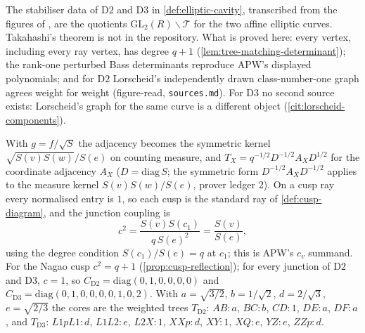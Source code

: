 \begin{assumption}
\label{asm:h-diag}
The stabiliser data of $\mathrm{D2}$ and $\mathrm{D3}$ in \cref{def:elliptic-cavity}, transcribed from the
figures of \cite{arends2026resonances}, are the quotients $\mathrm{GL}_2(R)\backslash\mathcal T$ for the two
affine elliptic curves. Takahashi's theorem is not in the repository. What is proved here: every vertex,
including every ray vertex, has degree $q+1$ (\cref{lem:tree-matching-determinant}); the rank-one
perturbed Bass determinants reproduce APW's displayed polynomials; and for $\mathrm{D2}$ Lorscheid's
independently drawn class-number-one graph agrees weight for weight (figure-read, \texttt{sources.md}). For
$\mathrm{D3}$ no second source exists: Lorscheid's graph for the same curve is a different object
(\cref{cit:lorscheid-components}).
\end{assumption}

\begin{proposition}[Normalisation with $h$ cusps; the arithmetic junction has $c = 1$]
\label{prop:stabiliser-normalisation}
With $g = f/\sqrt S$ the adjacency becomes the symmetric kernel $\sqrt{S(v)S(w)}/S(e)$ on counting measure,
and $T_X = q^{-1/2}D^{-1/2}A_XD^{1/2}$ for the coordinate adjacency $A_X$ ($D = \mathrm{diag}\,S$; the symmetric
form $D^{-1/2}A_XD^{-1/2}$ applies to the measure kernel $S(v)S(w)/S(e)$, prover ledger 2). On a cusp ray every
normalised entry is $1$, so each cusp is the standard ray of \cref{def:cusp-diagram}, and the junction
coupling is
\[
c^2 = \frac{S(v)S(c_1)}{q\,S(e)^2} = \frac{S(v)}{S(e)} ,
\]
using the degree condition $S(c_1)/S(e) = q$ at $c_1$; this is APW's $c_v$ summand. For the Nagao cusp
$c^2 = q+1$ (\cref{prop:cusp-reflection}); for every junction of $\mathrm{D2}$ and $\mathrm{D3}$, $c = 1$, so
$C_{\mathrm{D2}} = \mathrm{diag}(0,1,0,0,0,0)$ and $C_{\mathrm{D3}} = \mathrm{diag}(0,1,0,0,0,0,1,0,2)$. With
$a = \sqrt{3/2}$, $b = 1/\sqrt2$, $d = 2/\sqrt3$, $e = \sqrt{2/3}$ the cores are the weighted trees
$T_{\mathrm{D2}}$: $AB{:}a$, $BC{:}b$, $CD{:}1$, $DE{:}a$, $DF{:}a$, and $T_{\mathrm{D3}}$: $L1pL1{:}d$, $L1L2{:}e$,
$L2X{:}1$, $XXp{:}d$, $XY{:}1$, $XQ{:}e$, $YZ{:}e$, $ZZp{:}d$.
\end{proposition}

